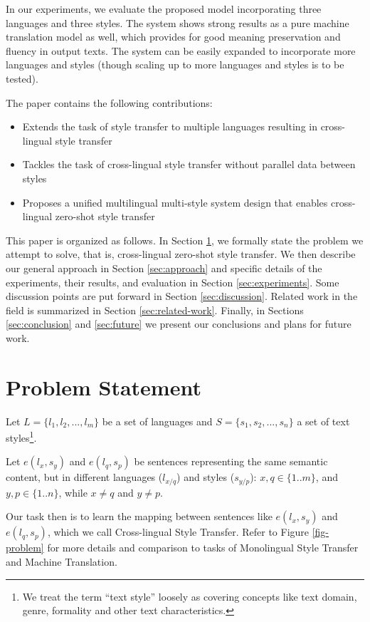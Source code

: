 \documentclass[11pt,a4paper]{article}
\begin{document}
In our experiments, we evaluate the proposed model incorporating three languages and three styles. The system shows strong results as a pure machine translation model as well, which provides for good meaning preservation and fluency in output texts. The system can be easily expanded to incorporate more languages and styles (though scaling up to more languages and styles is to be tested).

The paper contains the following contributions:
\begin{itemize}
\item  Extends the task of style transfer to multiple languages resulting in cross-lingual style transfer
\item  Tackles the task of cross-lingual style transfer without parallel data between styles
\item  Proposes a unified multilingual multi-style system design that enables cross-lingual zero-shot style transfer   
\end{itemize}

This paper is organized as follows. In Section \ref{sec:problem}, we formally state the problem we attempt to solve, that is, cross-lingual zero-shot style transfer. We then describe our general approach in Section \ref{sec:approach} and specific details of the experiments, their results, and evaluation in Section \ref{sec:experiments}. Some discussion points are put forward in Section \ref{sec:discussion}. Related work in the field is summarized in Section \ref{sec:related-work}. Finally, in Sections \ref{sec:conclusion} and \ref{sec:future} we present our conclusions and plans for future work.

\section{Problem Statement}
\label{sec:problem}

Let $L=\{l_1, l_2, ..., l_m\}$ be a set of languages 
and $S=\{s_1, s_2, ..., s_n\}$ a set of text styles\footnote{We treat the term ``text style'' loosely as covering concepts like text domain, genre, formality and other text characteristics.}.

Let $e(l_x, s_y)$ and $e(l_q, s_p)$ be sentences representing the same semantic content, but in different languages ($l_{x/q}$) and styles ($s_{y/p}$): $x,q \in \{1..m\}$, and $y,p \in \{1..n\}$, while $x{\neq}q$ and $y{\neq}p$.

Our task then is to %
learn the mapping between sentences like 
$e(l_x, s_y)$ and $e(l_q, s_p)$, which we call Cross-lingual Style Transfer. Refer to Figure \ref{fig-problem} for more details and comparison to tasks of Monolingual Style Transfer and Machine Translation.
\end{document}
